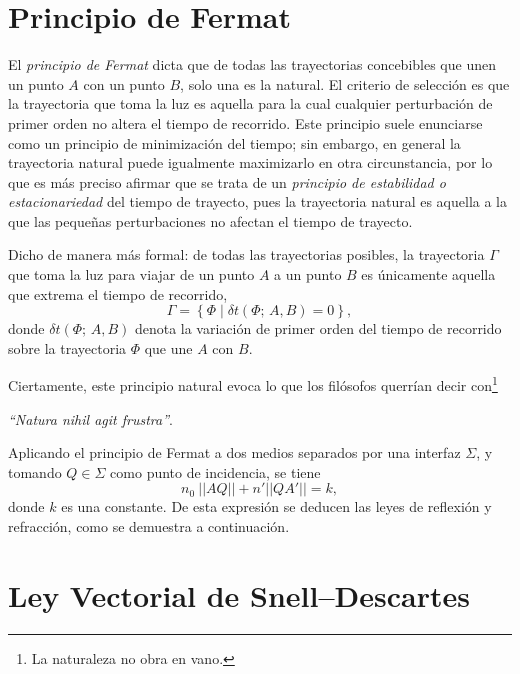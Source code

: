 \section{Principio de Fermat}

El \textit{principio de Fermat} dicta que de todas las trayectorias concebibles que unen un punto $A$ con un punto $B$, 
solo una es la natural. El criterio de selección es que la trayectoria 
que toma la luz es aquella para la cual cualquier perturbación de primer orden 
no altera el tiempo de recorrido. Este principio suele enunciarse como un 
principio de minimización del tiempo; sin embargo, en general la trayectoria 
natural puede igualmente maximizarlo en otra circunstancia, por lo que es más preciso afirmar que 
se trata de un \textit{principio de estabilidad o estacionariedad} del tiempo de trayecto, pues la trayectoria natural es aquella a la que las pequeñas perturbaciones no afectan el tiempo de trayecto.

Dicho de manera más formal: de todas las trayectorias posibles, la trayectoria 
$\Gamma$ que toma la luz para viajar de un punto $A$ a un punto $B$ es 
únicamente aquella que extrema el tiempo de recorrido,
%
\begin{equation}
    \Gamma = \left\{ \Phi \mid \delta t(\Phi;\, A, B) = 0 \right\},
    \label{eq:fermat_principle}
\end{equation}
%
donde $\delta t(\Phi;\, A, B)$ denota la variación de primer orden del tiempo 
de recorrido sobre la trayectoria $\Phi$ que une $A$ con $B$. 



Ciertamente, este principio natural evoca lo que los filósofos querrían decir con\footnote{La naturaleza no obra en vano.}
%
\vspace{0.5em}
%
\begin{center}
    \textit{``Natura nihil agit frustra''}.
\end{center}

Aplicando el principio de Fermat a dos medios separados por una interfaz $\Sigma$, y tomando
$Q \in \Sigma$ como punto de incidencia, se tiene
%
\begin{equation}
    n_0\ || AQ || + n' || QA' || = k,
    \label{eq:maxwell_condition_of_stigmatism_ovoid}
\end{equation}
%
donde $k$ es una constante.
De esta expresión se deducen las leyes de reflexión y refracción, como se demuestra a continuación.


\section{Ley Vectorial de Snell–Descartes} 

